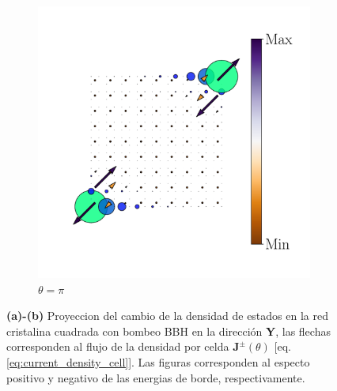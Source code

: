 \begin{figure}[tbh!]
\begin{minipage}[h!]{1.0\textwidth}
\begin{subfigure}[b!]{0.2 \textwidth}
         \end{subfigure}\hspace*{-0.5em}
          \begin{subfigure}[b!]{0.2 \textwidth}
             \caption*{$\theta = \pi$}
             \includegraphics[width=\textwidth]{Imagenes/Resultados_pump_Cuadrado/y/hoti_pomp_y_neg5.pdf}
         \end{subfigure}\hspace*{-0.5em}
     \end{minipage}
     
    
     
     
    \caption{\textbf{(a)-(b)} Proyeccion del cambio de la densidad de estados en la red cristalina cuadrada con bombeo BBH en la dirección \textbf{Y}, las flechas corresponden al flujo de la densidad por celda $\mathbf{J}^{\pm}(\theta)$ [eq. \ref{eq:current_density_cell}]. Las figuras corresponden al especto positivo y negativo de las energias de borde, respectivamente.}
    \label{fig:Proy_pump_y}
\end{figure}